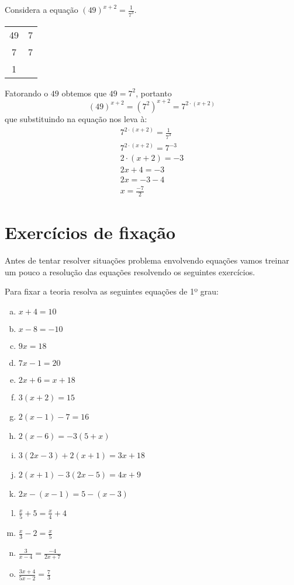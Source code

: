  \begin{exem}
  Considera a equação $(49)^{x+2}= \frac{1}{7^3}$.

  \begin{tabular}{c|c}
   49 & 7 \\
   7  & 7 \\
   1  &   \\
  \end{tabular}

  Fatorando o $49$ obtemos que $49= 7^2$, portanto
  \[(49)^{x+2}= (7^2)^{x+2}= 7^{2\cdot (x+2)}\]
  que substituindo na equação nos leva à:
  \begin{eqnarray*}
   7^{2\cdot (x+2)}= \frac{1}{7^3} \\
   7^{2\cdot (x+2)}= 7^{-3} \\
   2\cdot (x+2) = -3 \\
   2x + 4 = -3 \\
   2x= -3 -4 \\
   x= \frac{-7}{2}
  \end{eqnarray*}


 \end{exem}






\newpage

\section{Exercícios de fixação}

 Antes de tentar resolver situações problema envolvendo equações vamos treinar um pouco a resolução das equações resolvendo os seguintes exercícios.

  Para fixar a teoria resolva as seguintes equações de 1º grau:
 \begin{multicols}{2}
  \begin{enumerate}[a)]
   \item $x + 4= 10$
   \item $x - 8= -10$
   \item $9x= 18$
   \item $7x - 1 =20$
   \item $2x + 6= x + 18$
   \item $3(x + 2)= 15$
   \item $2(x-1)-7= 16$
   \item $2(x-6)= -3(5+x)$
   \item $3(2x-3) + 2(x+1)= 3x + 18$
   \item $2(x+1)- 3(2x-5)= 4x + 9$
   \item $2x-(x-1)=5-(x-3)$
   \item $\frac{x}{5}+ 5= \frac{x}{4} + 4$
   \item $\frac{x}{3} - 2= \frac{x}{5}$
   \item $\frac{3}{x-4}= \frac{-4}{2x+7}$
   \item $\frac{3x+4}{5x-2}= \frac{7}{3}$
 \end{enumerate}
 \end{multicols}

